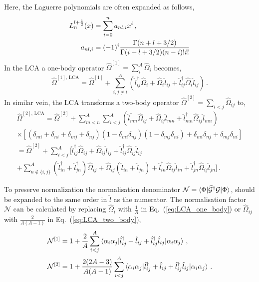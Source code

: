 \documentclass[10pt]{article}
\begin{document}
Here, the Laguerre polynomials are often expanded as follows,
\begin{align}
	L_{n}^{l+\frac{1}{2}}(x) &= \sum_{i=0}^{n} a_{nl,i} x^{i} \, , \notag \\
	a_{nl,i} &= (-1)^{i} \frac{ \Gamma(n+l+3/2) }{ \Gamma(i+l+3/2)(n-i)! i!}
	\label{eq:def:laguerre_exp}
\end{align}
In the LCA a one-body operator $\widehat{\Omega}^{[1]} = \sum_{i}^{A} \widehat{\Omega}_{i}$ becomes,
\begin{equation}
	\widehat{\Omega}^{[1],\,\text{LCA}} = \widehat{\Omega}^{[1]} + \sum_{i,j \neq i}^{A} \left( \hat{l}_{ij}^{\dagger} \widehat{\Omega}_{i} +  \widehat{\Omega}_{i} \hat{l}_{ij} + \hat{l}_{ij}^{\dagger}  \widehat{\Omega}_{i} \hat{l}_{ij} \right) \, .
	\label{eq:LCA_one_body}
\end{equation}
In similar vein, the LCA transforms a two-body operator $\widehat{\Omega}^{[2]} = \sum_{i<j} \widehat{\Omega}_{ij}$ to,
\begin{multline}
	\widehat{\Omega}^{[2],\,\text{LCA}} = 
	\widehat{\Omega}^{[2]}
	+ \sum_{m<n}^{A} \sum_{i<j}^{A} \left(
		\hat{l}_{mn}^{\dagger} \widehat{\Omega}_{ij} +
		\widehat{\Omega}_{ij} \hat{l}_{mn} +
		\hat{l}_{mn}^{\dagger} \widehat{\Omega}_{ij} \hat{l}_{mn}
	\right) \\ 
	\times \left[ ( \delta_{mi} + \delta_{ni} + \delta_{mj} + \delta_{nj} ) ( 1 - \delta_{mi} \delta_{nj})( 1 - \delta_{mj} \delta_{ni}) + \delta_{mi} \delta_{nj} + \delta_{mj} \delta_{ni} \right] \\
	= \widehat{\Omega}^{[2]} + 
	\sum_{i<j}^{A} \Big[ 
	\hat{l}_{ij}^{\dagger} \widehat{\Omega}_{ij} +
	\widehat{\Omega}_{ij} \hat{l}_{ij} +
	\hat{l}_{ij}^{\dagger} \widehat{\Omega}_{ij} \hat{l}_{ij} \\
	+ \sum_{n \notin \{i,j\}}^{A} 
	(\hat{l}_{in}^{\dagger} + \hat{l}_{jn}^{\dagger} ) \widehat{\Omega}_{ij} +
	\widehat{\Omega}_{ij} (\hat{l}_{in} + \hat{l}_{jn}) + 
	\hat{l}_{in}^{\dagger} \widehat{\Omega}_{ij} \hat{l}_{in} + \hat{l}_{jn}^{\dagger} \widehat{\Omega}_{ij} \hat{l}_{jn} 
	 \Big] \, .
	 \label{eq:LCA_two_body}
\end{multline} 

To preserve normalization the normalisation denominator $ \mathcal{N} = \braket{ \Phi | \widehat{\mathcal{G}}{^\dagger} \mathcal{G} | \Phi }$, should be expanded to the same order in $\hat{l}$ as the numerator. The normalisation factor $\mathcal{N}$ can be calculated by replacing $\widehat{\Omega}_i$ with $\frac{1}{A}$ in Eq.~(\ref{eq:LCA_one_body}) or $\widehat{\Omega}_{ij}$ with $\frac{2}{A(A-1)}$ in Eq.~(\ref{eq:LCA_two_body}),
\begin{align}
	\mathcal{N}^{[1]} &=  1 + \frac{2}{A} \sum_{i < j}^{A} \braket{ \alpha_{i} \alpha_{j} | \hat{l}^{\dagger}_{ij} + \hat{l}_{ij} + \hat{l}^{\dagger}_{ij} \hat{l}_{ij} | \alpha_{i} \alpha_{j}}  \, ,
	\label{eq:LCA_norm_one_body}	
	\\
	\mathcal{N}^{[2]} &=  1 + \frac{2(2A-3)}{A(A-1)} \sum_{i < j}^{A} \braket{ \alpha_{i} \alpha_{j} | \hat{l}^{\dagger}_{ij} + \hat{l}_{ij} + \hat{l}^{\dagger}_{ij} \hat{l}_{ij} | \alpha_{i} \alpha_{j}} \, .
	\label{eq:LCA_norm_two_body}
\end{align}
\end{document}
